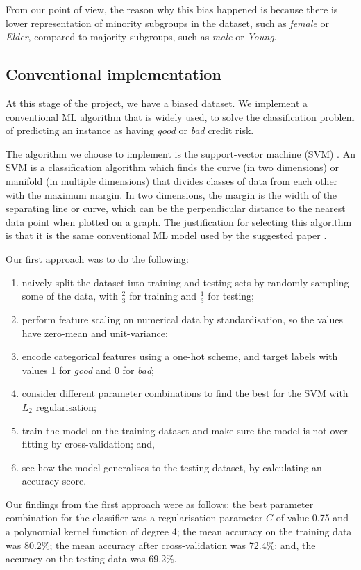 \documentclass[conference]{IEEEtran}
\begin{document}
From our point of view, the reason why this bias happened is because there is lower representation of minority subgroups in the dataset, such as \emph{female} or \emph{Elder}, compared to majority subgroups, such as \emph{male} or \emph{Young}.

\subsection{Conventional implementation}
At this stage of the project, we have a biased dataset. We implement a conventional ML algorithm that is widely used, to solve the classification problem of predicting an instance as having \emph{good} or \emph{bad} credit risk.

The algorithm we choose to implement is the support-vector machine (SVM) \cite{Cortes1995}. An SVM is a classification algorithm which finds the curve (in two dimensions) or manifold (in multiple dimensions) that divides classes of data from each other with the maximum margin. In two dimensions, the margin is the width of the separating line or curve, which can be the perpendicular distance to the nearest data point when plotted on a graph. The justification for selecting this algorithm is that it is the same conventional ML model used by the suggested paper \cite{Feldman2015ComputationalFP}.

Our first approach was to do the following:
\begin{enumerate}
    \item naively split the dataset into training and testing sets by randomly sampling some of the data, with $\frac{2}{3}$ for training and $\frac{1}{3}$ for testing;
    \item perform feature scaling on numerical data by standardisation, so the values have zero-mean and unit-variance;
    \item encode categorical features using a one-hot scheme, and target labels with values 1 for \emph{good} and 0 for \emph{bad};
    \item consider different parameter combinations to find the best for the SVM with $L_2$ regularisation;
    \item train the model on the training dataset and make sure the model is not over-fitting by cross-validation; and,
    \item see how the model generalises to the testing dataset, by calculating an accuracy score. 
\end{enumerate}

Our findings from the first approach were as follows: the best parameter combination for the classifier was a regularisation parameter $C$ of value 0.75 and a polynomial kernel function of degree 4; the mean accuracy on the training data was 80.2\%; the mean accuracy after cross-validation was 72.4\%; and, the accuracy on the testing data was 69.2\%.   
\end{document}
